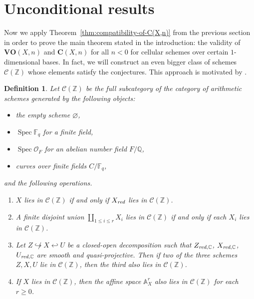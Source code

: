 \documentclass[10pt,a4paper,oneside,draft]{article}
\DeclareMathOperator{\Spec}{Spec}
\newcommand{\CC}{\mathbb{C}}
\newcommand{\FF}{\mathbb{F}}
\newcommand{\QQ}{\mathbb{Q}}
\newcommand{\ZZ}{\mathbb{Z}}
\renewcommand{\AA}{\mathbb{A}}
\renewcommand{\emptyset}{\varnothing}
\newcommand{\red}{\text{\it red}}
\theoremstyle{myplain}
\theoremstyle{mydefinition}
\newtheorem{definition}[theorem]{Definition}
\numberwithin{equation}{section}
\begin{document}

\section{Unconditional results}
\label{sec:unconditional-results}

Now we apply Theorem~\ref{thm:compatibility-of-C(X,n)} from the previous section
in order to prove the main theorem stated in the introduction: the validity of
$\mathbf{VO} (X,n)$ and $\mathbf{C} (X,n)$ for all $n < 0$ for cellular schemes
over certain $1$-dimensional bases. In fact, we will construct an even bigger
class of schemes $\mathcal{C} (\ZZ)$ whose elements satisfy the conjectures.
This approach is motivated by \cite[\S 5]{Morin-2014}.

\begin{definition}
  Let $\mathcal{C} (\ZZ)$ be the full subcategory of the category of arithmetic
  schemes generated by the following objects:
  \begin{itemize}
  \item the empty scheme $\emptyset$,
  \item $\Spec \FF_q$ for a finite field,
  \item $\Spec \mathcal{O}_F$ for an abelian number field $F/\QQ$,
  \item curves over finite fields $C/\FF_q$,
  \end{itemize}
  and the following operations.
  \begin{enumerate}
  \item[$\mathcal{C}0)$] $X$ lies in $\mathcal{C} (\ZZ)$ if and only if $X_\red$
    lies in $\mathcal{C} (\ZZ)$.

  \item[$\mathcal{C}1)$] A finite disjoint union $\coprod_{1 \le i \le r} X_i$
    lies in $\mathcal{C} (\ZZ)$ if and only if each $X_i$ lies in
    $\mathcal{C} (\ZZ)$.

  \item[$\mathcal{C}2)$] Let $Z \not\hookrightarrow X \hookleftarrow U$ be a
    closed-open decomposition such that $Z_{\red,\CC}$, $X_{\red,\CC}$,
    $U_{\red,\CC}$ are smooth and quasi-projective. Then if two of the three
    schemes $Z,X,U$ lie in $\mathcal{C} (\ZZ)$, then the third also lies in
    $\mathcal{C} (\ZZ)$.

  \item[$\mathcal{C}3)$] If $X$ lies in $\mathcal{C} (\ZZ)$, then the affine
    space $\AA^r_X$ also lies in $\mathcal{C} (\ZZ)$ for each $r \ge 0$.
  \end{enumerate}
\end{definition}
\end{document}
